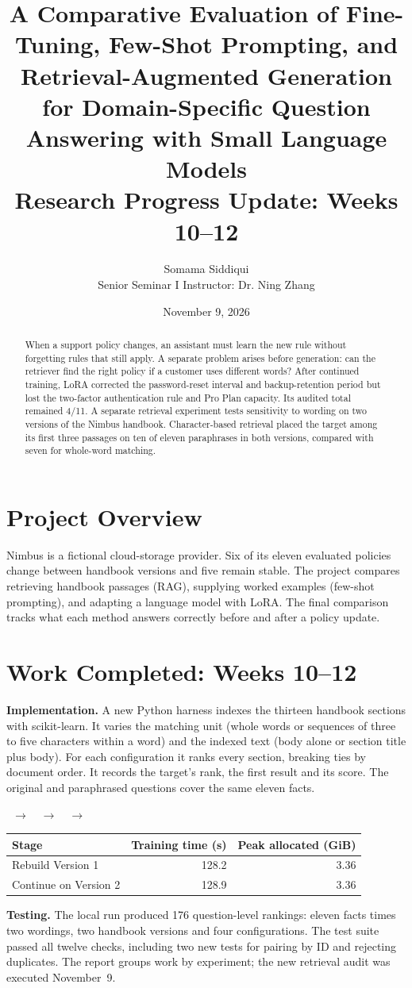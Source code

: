 \documentclass[10pt,letterpaper]{article}
\title{\vspace{-1.1em}\textbf{A Comparative Evaluation of Fine-Tuning, Few-Shot Prompting, and Retrieval-Augmented Generation for Domain-Specific Question Answering with Small Language Models}\\[0.4em]\large Research Progress Update: Weeks 10--12}
\author{Somama Siddiqui\\Senior Seminar I \quad Instructor: Dr. Ning Zhang}
\date{November 9, 2026}
\begin{document}
\maketitle
\begin{abstract}
When a support policy changes, an assistant must learn the new rule without forgetting rules that still apply. A separate problem arises before generation: can the retriever find the right policy if a customer uses different words? After continued training, LoRA corrected the password-reset interval and backup-retention period but lost the two-factor authentication rule and Pro Plan capacity. Its audited total remained 4/11. A separate retrieval experiment tests sensitivity to wording on two versions of the Nimbus handbook. Character-based retrieval placed the target among its first three passages on ten of eleven paraphrases in both versions, compared with seven for whole-word matching.
\end{abstract}
\section{Project Overview}
Nimbus is a fictional cloud-storage provider. Six of its eleven evaluated policies change between handbook versions and five remain stable. The project compares retrieving handbook passages (RAG), supplying worked examples (few-shot prompting), and adapting a language model with LoRA. The final comparison tracks what each method answers correctly before and after a policy update.
\section{Work Completed: Weeks 10--12}
\textbf{Implementation.} A new Python harness indexes the thirteen handbook sections with scikit-learn. It varies the matching unit (whole words or sequences of three to five characters within a word) and the indexed text (body alone or section title plus body). For each configuration it ranks every section, breaking ties by document order. It records the target's rank, the first result and its score. The original and paraphrased questions cover the same eleven facts.
\begin{center}
\ $\longrightarrow$\ \ $\longrightarrow$\ \ $\longrightarrow$\ 
\end{center}
\begin{center}\small\begin{tabular}{lrr}\toprule Stage & Training time (s) & Peak allocated (GiB)\\\midrule Rebuild Version 1 & 128.2 & 3.36\\ Continue on Version 2 & 128.9 & 3.36\\\bottomrule\end{tabular}\end{center}
\textbf{Testing.} The local run produced 176 question-level rankings: eleven facts times two wordings, two handbook versions and four configurations. The test suite passed all twelve checks, including two new tests for pairing by ID and rejecting duplicates. The report groups work by experiment; the new retrieval audit was executed November~9.
\clearpage
\end{document}
